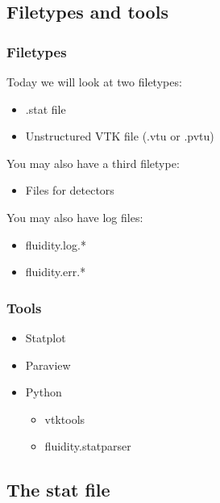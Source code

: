 \documentclass[12pt]{beamer}
\begin{document}
\subsection{Filetypes and tools}
\begin{frame}
    \frametitle{Filetypes}
Today we will look at two filetypes:
\begin{itemize}
    \item .stat file
    \item Unstructured VTK file (.vtu or .pvtu)
\end{itemize}
\vspace{5mm}
You may also have a third filetype:
\begin{itemize}
\item Files for detectors
\end{itemize}
\vspace{5mm}
You may also have log files:
\begin{itemize}
    \item fluidity.log.*
    \item fluidity.err.*
\end{itemize}

\end{frame}

\begin{frame}
    \frametitle{Tools}
\begin{itemize}
\item Statplot
\item Paraview
\item Python
    \begin{itemize}
    \item vtktools
    \item fluidity.statparser
    \end{itemize}
\end{itemize}
\end{frame}

\subsection{The stat file}
\end{document}
